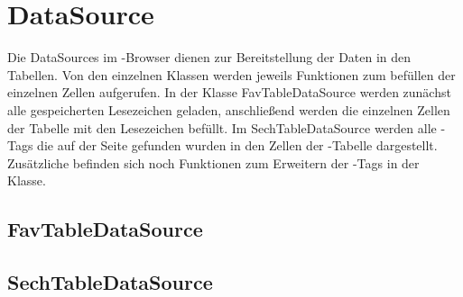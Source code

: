 
\section{DataSource}
Die DataSources im \SECH-Browser dienen zur Bereitstellung der Daten in den Tabellen. Von den einzelnen Klassen werden jeweils Funktionen zum befüllen der einzelnen Zellen aufgerufen. In der Klasse FavTableDataSource werden zunächst alle gespeicherten Lesezeichen geladen, anschließend werden die einzelnen Zellen der Tabelle mit den Lesezeichen befüllt. Im SechTableDataSource werden alle \SEARCH-Tags die auf der Seite gefunden wurden in den Zellen der \SECH-Tabelle dargestellt. Zusätzliche befinden sich noch Funktionen zum Erweitern der \SEARCH-Tags in der Klasse.

\subsection{FavTableDataSource}
\subsection{SechTableDataSource}


